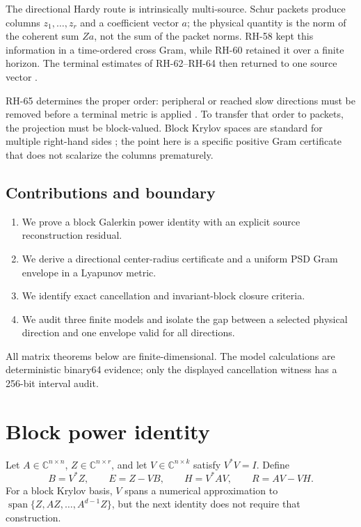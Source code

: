 \documentclass[11pt]{article}
\begin{document}
The directional Hardy route is intrinsically multi-source.  Schur packets
produce columns $z_1,\ldots,z_r$ and a coefficient vector $a$; the physical
quantity is the norm of the coherent sum $Za$, not the sum of the packet
norms.  RH-58 kept this information in a time-ordered cross Gram, while
RH-60 retained it over a finite horizon.  The terminal estimates of
RH-62--RH-64 then returned to one source vector
\citep{WangSchurGram2026,WangWeightedResidual2026}.

RH-65 determines the proper order: peripheral or reached slow directions
must be removed before a terminal metric is applied
\citep{WangMetricConditioning2026}.  To transfer that order to packets, the
projection must be block-valued.  Block Krylov spaces are standard for
multiple right-hand sides \citep{Saad2003}; the point here is a specific
positive Gram certificate that does not scalarize the columns prematurely.

\subsection*{Contributions and boundary}

\begin{enumerate}[leftmargin=2.2em]
 \item We prove a block Galerkin power identity with an explicit source
       reconstruction residual.
 \item We derive a directional center-radius certificate and a uniform PSD
       Gram envelope in a Lyapunov metric.
 \item We identify exact cancellation and invariant-block closure criteria.
 \item We audit three finite models and isolate the gap between a selected
       physical direction and one envelope valid for all directions.
\end{enumerate}

All matrix theorems below are finite-dimensional.  The model calculations
are deterministic binary64 evidence; only the displayed cancellation witness
has a 256-bit interval audit.

\section{Block power identity}
\label{sec:identity}

Let $A\in\mathbb C^{n\times n}$, $Z\in\mathbb C^{n\times r}$, and let
$V\in\mathbb C^{n\times k}$ satisfy $V^*V=I$.  Define
\begin{equation}
 B=V^*Z,\qquad E=Z-VB,\qquad
 H=V^*AV,\qquad R=AV-VH.
 \label{eq:block-data}
\end{equation}
For a block Krylov basis, $V$ spans a numerical approximation to
$\operatorname{span}\{Z,AZ,\ldots,A^{d-1}Z\}$, but the next identity does
not require that construction.
\end{document}
